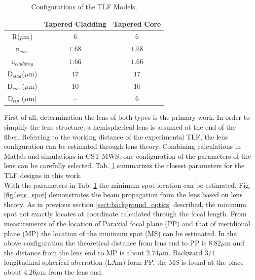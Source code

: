 \begin{table}[!ht]
\caption{Configurations of the TLF Models.}
\centering
\begin{tabular}{ccc}
\hline
							&Tapered Cladding&Tapered Core\\
\hline
R($\mu$m) & $6$						 &$6$	\\
n$_{core}$&$1.68$&$1.68$\\
n$_{cladding}$&$1.66$&$1.66$\\
D$_{clad}$($\mu$m) &	$17$ &	$17$\\
D$_{core}$($\mu$m) & $10$ &	$10$\\
D$_{tip}$ ($\mu$m) & --   &	$6$\\
\hline
\end{tabular}
\label{tab:model_fiber_configuration}
\end{table}
First of all, determination the lens of both types is the primary work. In order to simplify the lens structure, a hemispherical lens is assumed at the end of the fiber. Referring to the working distance of the experimental TLF, the lens configuration can be estimated through lens theory. Combining calculations in Matlab and simulations in CST MWS, one configuration of the parameters of the lens can be carefully selected. Tab. \ref{tab:model_fiber_configuration} summarizes the closest parameters for the TLF designs in this work.\\   

With the parameters in Tab. \ref{tab:model_fiber_configuration} the minimum spot location can be estimated. Fig. \ref{fig:lens_spot} demonstrates the beam propagation from the lens based on lens theory. As in previous section \ref{sect:background_optics} described, the minimum spot not exactly locates at coordinate calculated through the focal length. From measurements of the location of Paraxial focal plane (PP) and that of meridional plane (MP) the location of the minimum spot (MS) can be estimated. In the above configuration the theoretical distance from lens end to PP is $8.82 \mu$m and the distance from the lens end to MP is about $2.74 \mu$m. Backward $3/4$ longitudinal spherical aberration (LAm) form PP, the MS is found at the place about $4.26 \mu$m from the lens end. \\ 

